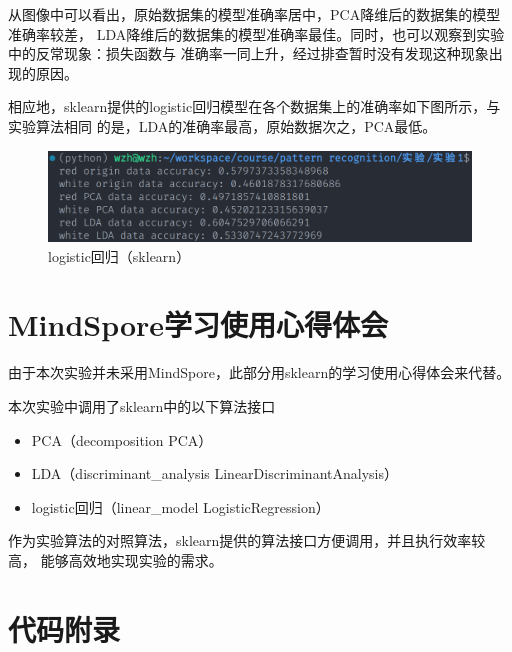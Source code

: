 \documentclass[notitlepage]{article}
\begin{document}
从图像中可以看出，原始数据集的模型准确率居中，PCA降维后的数据集的模型准确率较差，
LDA降维后的数据集的模型准确率最佳。同时，也可以观察到实验中的反常现象：损失函数与
准确率一同上升，经过排查暂时没有发现这种现象出现的原因。

相应地，sklearn提供的logistic回归模型在各个数据集上的准确率如下图所示，与实验算法相同
的是，LDA的准确率最高，原始数据次之，PCA最低。
\begin{figure}[htbp]
    \centering
    \includegraphics*[width=\columnwidth]{../imgs/sklearn/acc.png}
    \caption{logistic回归（sklearn）}
\end{figure}

\section{MindSpore学习使用心得体会}

由于本次实验并未采用MindSpore，此部分用sklearn的学习使用心得体会来代替。

本次实验中调用了sklearn中的以下算法接口

\begin{itemize}
    \item PCA（decomposition PCA）
    \item LDA（discriminant\_analysis LinearDiscriminantAnalysis）
    \item logistic回归（linear\_model LogisticRegression）
\end{itemize}

作为实验算法的对照算法，sklearn提供的算法接口方便调用，并且执行效率较高，
能够高效地实现实验的需求。

\section{代码附录}
\end{document}
